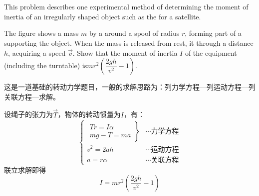 \chapter[转动动力学]{}
\begin{solution}
    This problem describes one experimental method of
    determining the moment of inertia of an irregularly
    shaped object such as the  for a satellite.
    \begin{center}
    \end{center}

    The figure shows a mass $m$  by a  
    around a spool of radius $r$, forming part of a 
    supporting the object. When the mass is released from
    rest, it  through a distance $h$, acquiring a speed
    $\vec{v}$. Show that the moment of inertia $I$ of the equipment
    (including the turntable) is\quad$mr^2(\dfrac{2gh}{v^2}-1)$.

    \tcbrule

    这是一道基础的转动力学题目，一般的求解思路为：列力学方程---列运动方程---列关联方程---求解。

    设绳子的张力为$\vec{T}$，物体的转动惯量为$I$，有：
    \[\left\{
        \begin{array}{cc}
            \left.\begin{array}{c}
                      Tr=I\alpha \\
                      mg-T=ma
                  \end{array}\right\} & \cdots\text{力学方程} \\
            v^2=2ah                & \cdots\text{运动方程}    \\
            a=r\alpha              & \cdots\text{关联方程}
        \end{array}
        \right.\]
    联立求解即得\[I=mr^2(\dfrac{2gh}{v^2}-1)\]
\end{solution}

